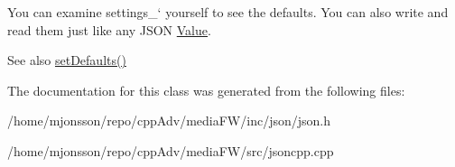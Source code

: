 You can examine \textquotesingle{}settings\+\_\+` yourself to see the defaults. You can also write and read them just like any J\+S\+ON \hyperlink{classJson_1_1Value}{Value}. \begin{DoxySeeAlso}{See also}
\hyperlink{classJson_1_1StreamWriterBuilder_a53bf106b141e28637b01ad0ecd2acbf6}{set\+Defaults()} 
\end{DoxySeeAlso}


The documentation for this class was generated from the following files\+:\begin{DoxyCompactItemize}
\item 
/home/mjonsson/repo/cpp\+Adv/media\+F\+W/inc/json/json.\+h\item 
/home/mjonsson/repo/cpp\+Adv/media\+F\+W/src/jsoncpp.\+cpp\end{DoxyCompactItemize}
